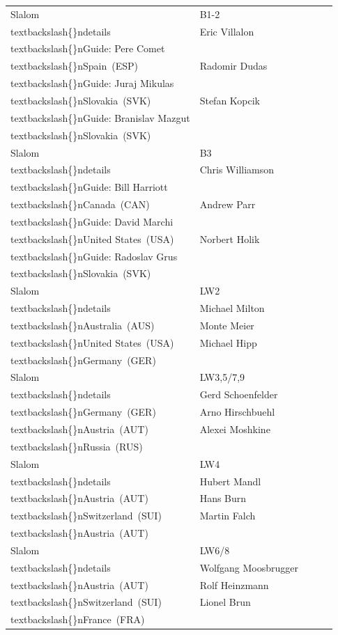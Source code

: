 \documentclass{article}
\begin{document}
\begin{tabular}{lllll}
Slalom & B1-2\\textbackslash\{\}ndetails & Eric Villalon\\textbackslash\{\}nGuide: Pere Comet\\textbackslash\{\}nSpain (ESP) & Radomir Dudas\\textbackslash\{\}nGuide: Juraj Mikulas\\textbackslash\{\}nSlovakia (SVK) & Stefan Kopcik\\textbackslash\{\}nGuide: Branislav Mazgut\\textbackslash\{\}nSlovakia (SVK) \\
Slalom & B3\\textbackslash\{\}ndetails & Chris Williamson\\textbackslash\{\}nGuide: Bill Harriott\\textbackslash\{\}nCanada (CAN) & Andrew Parr\\textbackslash\{\}nGuide: David Marchi\\textbackslash\{\}nUnited States (USA) & Norbert Holik\\textbackslash\{\}nGuide: Radoslav Grus\\textbackslash\{\}nSlovakia (SVK) \\
Slalom & LW2\\textbackslash\{\}ndetails & Michael Milton\\textbackslash\{\}nAustralia (AUS) & Monte Meier\\textbackslash\{\}nUnited States (USA) & Michael Hipp\\textbackslash\{\}nGermany (GER) \\
Slalom & LW3,5/7,9\\textbackslash\{\}ndetails & Gerd Schoenfelder\\textbackslash\{\}nGermany (GER) & Arno Hirschbuehl\\textbackslash\{\}nAustria (AUT) & Alexei Moshkine\\textbackslash\{\}nRussia (RUS) \\
Slalom & LW4\\textbackslash\{\}ndetails & Hubert Mandl\\textbackslash\{\}nAustria (AUT) & Hans Burn\\textbackslash\{\}nSwitzerland (SUI) & Martin Falch\\textbackslash\{\}nAustria (AUT) \\
Slalom & LW6/8\\textbackslash\{\}ndetails & Wolfgang Moosbrugger\\textbackslash\{\}nAustria (AUT) & Rolf Heinzmann\\textbackslash\{\}nSwitzerland (SUI) & Lionel Brun\\textbackslash\{\}nFrance (FRA) \\

\end{tabular}
\end{document}
